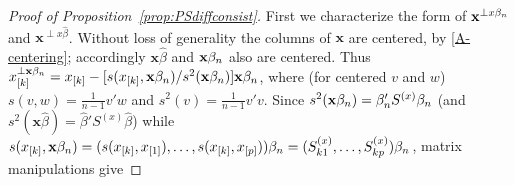 \documentclass{article}
\theoremstyle{remark}
\begin{document}
\begin{proof}[Proof of Proposition~\ref{prop:PSdiffconsist}] 


 First we characterize the form of  $\mathbf{x}^{\perp x\beta_{n }}$ and  $\mathbf{x}^{\perp x\hat\beta}$.  
 Without loss of generality the columns of $\mathbf{x}$ are centered, by \ref{A-centering}; accordingly $\mathbf{x}\hat\beta $ and $\mathbf{x}\beta_{n } $ also are centered. Thus ${x}^{\perp \mathbf{x}\beta_{n }}_{[k]} = {x}_{[k]} - [s({x}_{[k]}, \mathbf{x}\beta_{n })/s^{2}(\mathbf{x}\beta_{n })] \mathbf{x}\beta_{n } $, where (for centered $v$ and $w$) $s(v,w) = \frac{1}{n-1} v'w$ and $s^{2}(v) = \frac{1}{n-1} v'v$.  Since $s^{2}(\mathbf{x}\beta_{n }) = \beta_{n }'S^{(x)}\beta_{n }$ (and $s^{2}(\mathbf{x}\hat\beta) = \hat\beta'S^{(x)}\hat\beta$) while $s({x}_{[k]}, \mathbf{x}\beta_{n }) = (s({x}_{[k]}, {x}_{[1]}), \ldots, s({x}_{[k]}, {x}_{[p]}))\beta_{n } = (S^{(x)}_{k1}, \ldots, S^{(x)}_{kp}) \beta_{n }$, matrix manipulations give


\end{proof}
\end{document}
